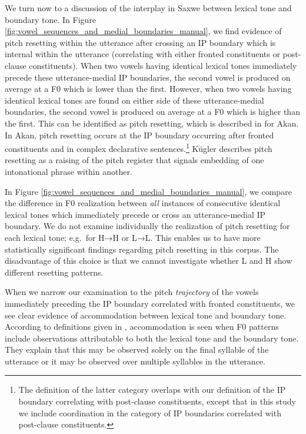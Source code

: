 \documentclass[
  11pt,
  b5paper,
]{article}
\begin{document}
We turn now to a discussion of the interplay in Saxwe between lexical
tone and boundary tone. In Figure
\ref{fig:vowel_sequences_and_medial_boundaries_manual}, we find evidence
of pitch resetting within the utterance after crossing an IP boundary
which is internal within the utterance (correlating with either fronted
constituents or post-clause constituents). When two vowels having
identical lexical tones immediately precede these utterance-medial IP
boundaries, the second vowel is produced on average at a F0 which is
lower than the first. However, when two vowels having identical lexical
tones are found on either side of these utterance-medial boundaries, the
second vowel is produced on average at a F0 which is higher than the
first. This can be identified as pitch resetting, which is described in
\textcite{kugler_tone_2017} for Akan. In Akan, pitch resetting occurs at
the IP boundary occurring after fronted constituents and in complex
declarative sentences.\footnote{The definition of the latter category
  overlaps with our definition of the IP boundary correlating with
  post-clause constituents, except that in this study we include
  coordination in the category of IP boundaries correlated with
  post-clause constituents.} Kügler describes pitch resetting as a
raising of the pitch register that signals embedding of one intonational
phrase within another.

In Figure \ref{fig:vowel_sequences_and_medial_boundaries_manual}, we
compare the difference in F0 realization between \emph{all} instances of
consecutive identical lexical tones which immediately precede or cross
an utterance-medial IP boundary. We do not examine individually the
realization of pitch resetting for each lexical tone; e.g.~for H→H or
L→L. This enables us to have more statistically significant findings
regarding pitch resetting in this corpus. The disadvantage of this
choice is that we cannot investigate whether L and H show different
resetting patterns.

When we narrow our examination to the pitch \emph{trajectory} of the
vowels immediately preceding the IP boundary correlated with fronted
constituents, we see clear evidence of accommodation between lexical
tone and boundary tone. According to definitions given in
\textcite{hyman_tonal_2011}, accommodation is seen when F0 patterns
include observations attributable to both the lexical tone and the
boundary tone. They explain that this may be observed solely on the
final syllable of the utterance or it may be observed over multiple
syllables in the utterance.
\end{document}
